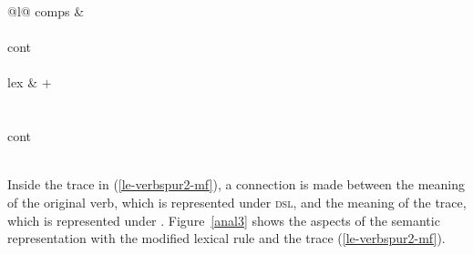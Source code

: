{\begin{tabular}{@{}l@{}}
{{{{{{{                                                                                  %
                                                                                  comps & \\
                                                                                  }\\
                                                                          cont \\ 
                                                                     }\\
                                                               lex & $+$\\
                                                           }}\\
                            }\\
        cont \\
      }\\
}
\end{tabular}}
\zs
Inside the trace in (\ref{le-verbspur2-mf}), a connection is made between the meaning of the original verb, which is represented
under \textsc{dsl}, and the meaning of the trace, which is represented under \local.
Figure~\vref{anal3} shows the aspects of the semantic representation with the modified lexical rule and the trace (\ref{le-verbspur2-mf}).

